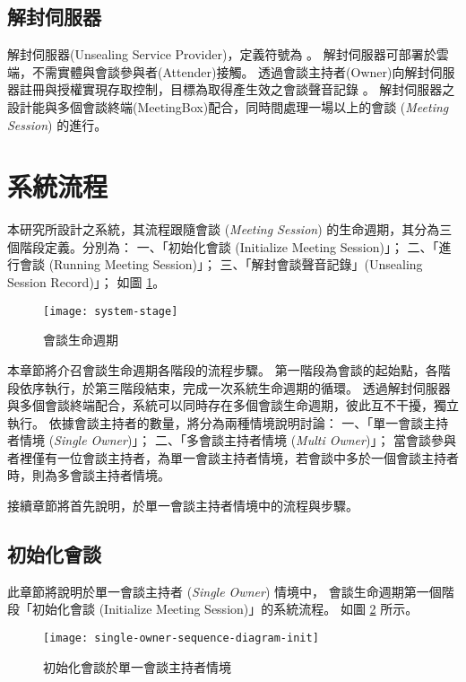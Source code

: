 \subsection{解封伺服器}

    解封伺服器(Unsealing Service Provider)，定義符號為 \DEFserver。
解封伺服器可部署於雲端，不需實體與會談參與者(Attender)接觸。
透過會談主持者(Owner)向解封伺服器註冊與授權實現存取控制，目標為取得產生效之會談聲音記錄 \DEFrecREV。
解封伺服器之設計能與多個會談終端(MeetingBox)配合，同時間處理一場以上的會談 ({\it Meeting Session}) 的進行。


\section{系統流程}\label{sec:system-flow}

    本研究所設計之系統，其流程跟隨會談 ({\it Meeting Session}) 的生命週期，其分為三個階段定義。分別為：
一、「初始化會談 (Initialize Meeting Session)」；
二、「進行會談 (Running Meeting Session)」；
三、「解封會談聲音記錄」(Unsealing Session Record)」；
如圖 \ref{fig:system-stage}。

\begin{figure}[H]
    \centering
    \texttt{[image: system-stage]}
    \caption{會談生命週期}\label{fig:system-stage}
\end{figure}

    本章節將介召會談生命週期各階段的流程步驟。
第一階段為會談的起始點，各階段依序執行，於第三階段結束，完成一次系統生命週期的循環。
透過解封伺服器與多個會談終端配合，系統可以同時存在多個會談生命週期，彼此互不干擾，獨立執行。
依據會談主持者的數量，將分為兩種情境說明討論：
一、「單一會談主持者情境 ({\it Single Owner})」；
二、「多會談主持者情境 ({\it Multi Owner})」；
當會談參與者裡僅有一位會談主持者，為單一會談主持者情境，若會談中多於一個會談主持者時，則為多會談主持者情境。

    接續章節將首先說明，於單一會談主持者情境中的流程與步驟。


\subsection{初始化會談}\label{subsec:initialize}

    此章節將說明於單一會談主持者 ({\it Single Owner}) 情境中，
會談生命週期第一個階段「初始化會談 (Initialize Meeting Session)」的系統流程。
如圖 \ref{fig:s-o-init} 所示。

\begin{figure}[H]
    \centering
    \texttt{[image: single-owner-sequence-diagram-init]}
    \caption{初始化會談於單一會談主持者情境}\label{fig:s-o-init}
\end{figure}

